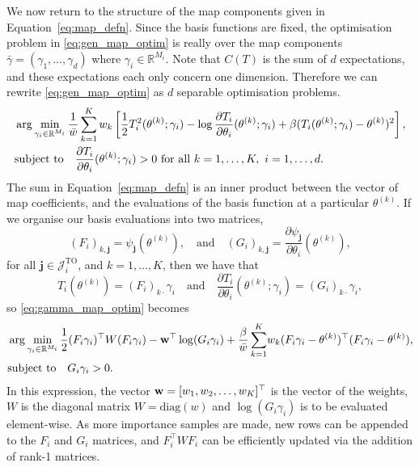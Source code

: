\documentclass[final]{siamltex}
\begin{document}
We now return to the structure of the map components given in Equation~\eqref{eq:map_defn}. Since the basis functions are
fixed, the optimisation problem in \eqref{eq:gen_map_optim} is really over the map components $\bar{\gamma} = (\gamma_1, \dots,
\gamma_d)$ where $\gamma_i \in \mathbb{R}^{M_i}$. Note that $C(T)$ is the sum of $d$ expectations, and these expectations each only concern one dimension. Therefore we can rewrite \eqref{eq:gen_map_optim} as $d$ separable optimisation problems.
\begin{align}\label{eq:gamma_map_optim}
	&\arg\min_{\gamma_i\in\mathbb{R}^{M_i}} \frac{1}{\bar{w}}\sum\limits_{k=1}^K
		w_k \left[\frac{1}{2}T_i^2(\theta^{(k)}; \gamma_i) - \log\frac{\partial T_i}{\partial\theta_i}(\theta^{(k)}; \gamma_i) + \beta(T_i(\theta^{(k)};
		\gamma_i)-\theta^{(k)})^2\right], \\
	&\text{subject to} \quad \frac{\partial T_i}{\partial\theta_i}(\theta^{(k)};
		\gamma_i) > 0 \ \text{for all}\ k=1,\dots,K,\ i=1,\dots,d.
		\notag
\end{align}
The sum in Equation~\eqref{eq:map_defn} is an inner
product between the vector of map coefficients, and the evaluations of the basis function at a
particular $\theta^{(k)}$. If we organise our basis evaluations into two matrices,
\[
	(F_i)_{k,\mathbf{j}} = \psi_\mathbf{j}(\theta^{(k)}), \quad \text{and} \quad (G_i)_{k,\mathbf{j}} =
\frac{\partial\psi_\mathbf{j}}{\partial\theta_i}(\theta^{(k)}),
\]
for all $\mathbf{j}
\in \mathcal{J}_i^\text{TO}$, and $k = 1,\dots,K$, then we have that
\[
	T_i(\theta^{(k)}) = (F_i)_{k\cdot}\gamma_i \quad \text{and} \quad \frac{\partial T_i}{\partial \theta_i}(\theta^{(k)}; \gamma_i) = (G_i)_{k\cdot}\gamma_i,
\]
so \eqref{eq:gamma_map_optim} becomes
\begin{align}\label{eq:blas_map_optim}
	&\arg\min_{\gamma_i\in\mathbb{R}^{M_i}}
          \frac{1}{2}(F_i\gamma_i)^\top W (F_i\gamma_i) -
		{\bf w}^\top\log(G_i\gamma_i) + \frac{\beta}{\bar{w}}\sum\limits_{k=1}^K \!
		w_k(F_i\gamma_i-\theta^{(k)})^\top(F_i\gamma_i-\theta^{(k)}), \\
	&\text{subject to} \quad G_i\gamma_i > 0. \notag
\end{align}
In this expression, the vector ${\bf w} = [w_1, w_2, \ldots,
w_K]^\top$ is the vector of the weights, $W$ is the diagonal matrix $W
= \text{diag}(w)$ and $\log(G_i\gamma_i)$ is to be
evaluated element-wise. As more importance samples are made, new rows can be appended to the
$F_i$ and $G_i$ matrices, and $F_i^\top W F_i$ can be efficiently updated via the addition of rank-1 matrices.
\end{document}
